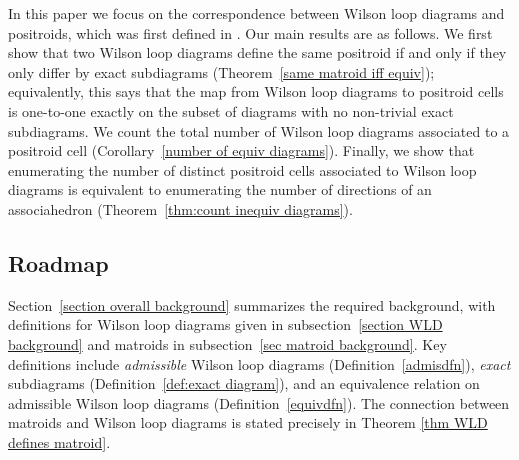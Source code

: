 \documentclass[11pt]{article}
\newcommand{\hlfix}[2]{\texthl{#1}\todo{#2}}
\theoremstyle{remark}
\theoremstyle{definition}
\begin{document}
In this paper we focus on the correspondence between Wilson loop diagrams and positroids, which was first defined in \cite{wilsonloop}. Our main results are as follows. We first show that two Wilson loop diagrams define the same positroid if and only if they only differ by exact subdiagrams (Theorem~\ref{same matroid iff equiv}); equivalently, this says that the map from Wilson loop diagrams to positroid cells is one-to-one exactly on the subset of diagrams with no non-trivial exact subdiagrams. We count the total number of Wilson loop diagrams associated to a positroid cell (Corollary~\ref{number of equiv diagrams}). Finally, we show that enumerating the number of distinct positroid cells associated to Wilson loop diagrams is equivalent to enumerating the number of directions of an associahedron (Theorem~\ref{thm:count inequiv diagrams}).



\subsection{Roadmap}

Section~\ref{section overall background} summarizes the required background, with definitions for Wilson loop diagrams given in subsection~\ref{section WLD background} and matroids in subsection~\ref{sec matroid background}. Key definitions include {\em admissible} Wilson loop diagrams (Definition~\ref{admisdfn}), {\em exact} subdiagrams (Definition~\ref{def:exact diagram}), and an equivalence relation on admissible Wilson loop diagrams (Definition~\ref{equivdfn}).  The connection between matroids and Wilson loop diagrams is stated precisely in Theorem \ref{thm WLD defines matroid}.
\end{document}
